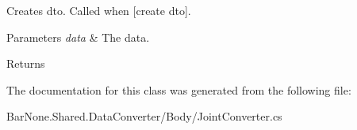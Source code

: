 Creates dto. Called when \mbox{[}create dto\mbox{]}. 


\begin{DoxyParams}{Parameters}
{\em data} & The data.\\
\hline
\end{DoxyParams}
\begin{DoxyReturn}{Returns}

\end{DoxyReturn}


The documentation for this class was generated from the following file\+:\begin{DoxyCompactItemize}
\item 
Bar\+None.\+Shared.\+Data\+Converter/\+Body/Joint\+Converter.\+cs\end{DoxyCompactItemize}
